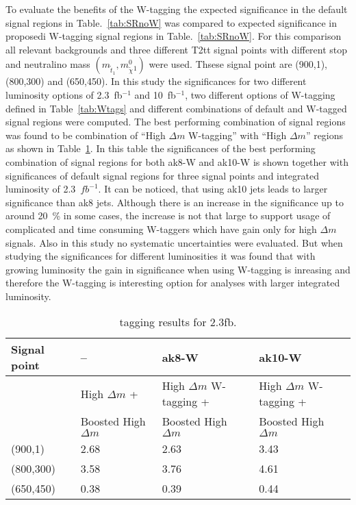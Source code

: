 To evaluate the benefits of the W-tagging  the expected significance in the default signal regions in Table.~\ref{tab:SRnoW} was compared to expected significance in proposedi W-tagging signal regions in Table.~\ref{tab:SRnoW}. For this comparison all relevant backgrounds and three different T2tt signal points with different stop and neutralino mass $(m_{\tilde{t}_{1}}, m_{\tilde{\chi}}^{0}_{1})$ were used. Thsese signal point are (900,1), (800,300) and (650,450). In this study the significances for two different luminosity options of 2.3~fb$^{-1}$ and 10~fb$^{-1}$, two different options of W-tagging defined in Table~\ref{tab:Wtags} and different combinations of default and W-tagged signal regions were computed. The best performing combination of signal regions was found to be combination of ``High $\Delta m$ W-tagging'' with ``High $\Delta m$'' regions as shown in Table~\ref{tab:taggingResults}. In this table the significances of the best performing combination of signal regions for both ak8-W and ak10-W is shown together with significances of default signal regions for three signal points and integrated luminosity of 2.3~$fb^{-1}$. It can be noticed, that using ak10 jets leads to larger significance than ak8 jets. Although there is an increase in the significance up to around 20~\% in some cases, the increase is not that large to support usage of complicated and time consuming W-taggers which have gain only for high $\Delta m$ signals. Also in this study no systematic uncertainties were evaluated. But when studying the significances for different luminosities it was found that with growing luminosity the gain in significance when using W-tagging is inreasing and therefore the W-tagging is interesting option for analyses with larger integrated luminosity. 

\begin{table}[h]
\begin{center}
\begin{tabular}{|l|l|l|l|}
\hline
Signal point             & --      & ak8-W & ak10-W \\
\hline
                       & High $\Delta m$ +           &  High $\Delta m$ W-tagging +  &   High $\Delta m$ W-tagging +  \\
                       &  Boosted High $\Delta m$    & Boosted High $\Delta m$       &   Boosted High $\Delta m$  \\
\hline
\hline
(900,1) &     2.68 & 2.63 & 3.43  \\
\hline
(800,300) &   3.58 & 3.76 & 4.61  \\
\hline
(650,450) &   0.38 & 0.39 & 0.44  \\
\hline
\end{tabular}
\caption[Table caption text]{tagging results for 2.3fb. }
\label{tab:taggingResults}
\end{center}
\end{table}


